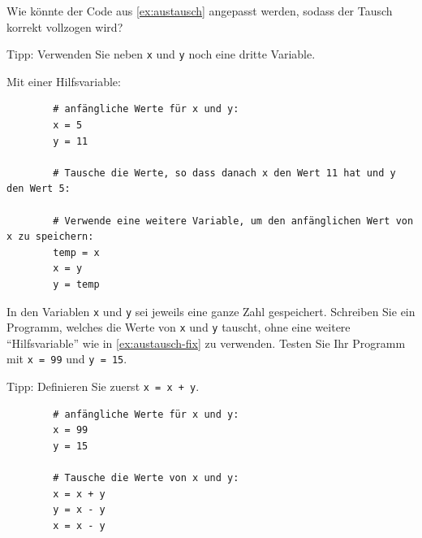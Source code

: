 \begin{myexercise}\label{ex:austausch-fix}
	Wie könnte der Code aus \cref{ex:austausch} angepasst werden, sodass der Tausch korrekt vollzogen wird?

	Tipp: Verwenden Sie neben \lstinline|x| und \lstinline|y| noch eine dritte Variable.
	\begin{myanswer}
		Mit einer Hilfsvariable:
		\begin{lstlisting}
		# anfängliche Werte für x und y:
		x = 5 
		y = 11

		# Tausche die Werte, so dass danach x den Wert 11 hat und y den Wert 5:

		# Verwende eine weitere Variable, um den anfänglichen Wert von x zu speichern:
		temp = x
		x = y
		y = temp
	\end{lstlisting}
	\end{myanswer}
\end{myexercise}

\begin{mychallenge}\label{mychallenge:tausch_mit_2_variablen}
	In den Variablen \lstinline|x| und \lstinline|y| sei jeweils eine ganze Zahl gespeichert. Schreiben Sie ein Programm, welches die Werte von \lstinline|x| und \lstinline|y| tauscht, ohne eine weitere \enquote{Hilfsvariable} wie in \cref{ex:austausch-fix} zu verwenden. Testen Sie Ihr Programm mit \lstinline|x = 99| und \lstinline|y = 15|.

	Tipp: Definieren Sie zuerst \lstinline|x = x + y|.
	\begin{myanswer}
		\begin{lstlisting}
		# anfängliche Werte für x und y:
		x = 99
		y = 15
		
		# Tausche die Werte von x und y:
		x = x + y
		y = x - y
		x = x - y
	\end{lstlisting}
	\end{myanswer}
\end{mychallenge}


